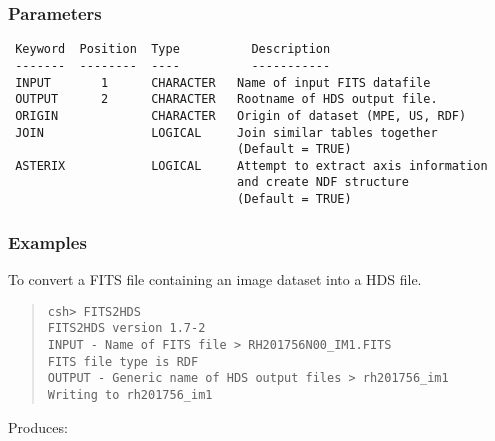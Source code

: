 \documentclass{book}
\renewcommand{\_}{{\tt\char'137}}     %
\begin{document}
\subsubsection{Parameters}
\begin{verbatim}
 Keyword  Position  Type          Description
 -------  --------  ----          -----------
 INPUT       1      CHARACTER   Name of input FITS datafile
 OUTPUT      2      CHARACTER   Rootname of HDS output file.
 ORIGIN             CHARACTER   Origin of dataset (MPE, US, RDF)
 JOIN               LOGICAL     Join similar tables together
                                (Default = TRUE)
 ASTERIX            LOGICAL     Attempt to extract axis information
                                and create NDF structure
                                (Default = TRUE)

\end{verbatim}\subsubsection{Examples}
To convert a FITS file containing an image dataset into a HDS file.
\begin{quote}\begin{verbatim}
csh> FITS2HDS
FITS2HDS version 1.7-2
INPUT - Name of FITS file > RH201756N00_IM1.FITS
FITS file type is RDF
OUTPUT - Generic name of HDS output files > rh201756_im1
Writing to rh201756_im1
\end{verbatim}\end{quote}
Produces:
\end{document}
